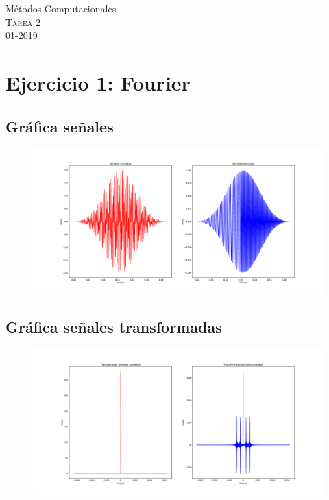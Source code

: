 \documentclass[11pt,letterpaper]{exam}
\begin{document}
\begin{center}
{\Large Métodos Computacionales} \\
\textsc{Tarea 2}\\
01-2019\\
\end{center}

\noindent
\section{Ejercicio 1: Fourier}
\subsection{Gráfica señales}
\begin{figure}[H]
\centering
\includegraphics[scale=0.35]{PlotFourier1.pdf}
\end{figure}

\subsection{Gráfica señales transformadas}
\begin{figure}[H]
\centering
\includegraphics[scale=0.35]{PlotTransFourier2.pdf}
\end{figure}
\end{document}
